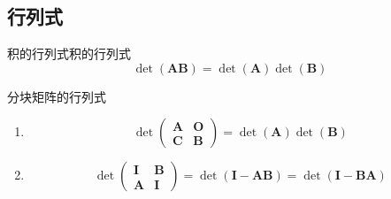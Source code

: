 \documentclass[lang = cn, scheme = chinese, thmcnt = section]{elegantbook}
\newcommand{\bs}{\boldsymbol}          %
\begin{document}
\subsection{行列式}

\begin{proposition}{积的行列式}{积的行列式}
	$$
	\det(\bs{AB})=\det(\bs{A})\det(\bs{B})
	$$
\end{proposition}

\begin{proposition}{分块矩阵的行列式}
	\begin{enumerate}
		\item $$
		\det\begin{pmatrix}
			\bs{A} & \bs{O}\\
			\bs{C} & \bs{B}
		\end{pmatrix}
		=\det(\bs{A})\det(\bs{B})
		$$
		\item $$
		\det\begin{pmatrix}
			\bs{I} & \bs{B}\\
			\bs{A} & \bs{I}
		\end{pmatrix}
		=\det(\bs{I}-\bs{AB})
		=\det(\bs{I}-\bs{BA})
		$$
	\end{enumerate}
\end{proposition}
\end{document}
